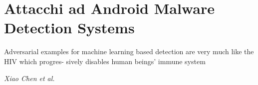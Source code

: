 \graphicspath{ {aml_vs_md/imgs/} }

\section{Attacchi ad Android Malware Detection Systems}

\epigraph{Adversarial examples for machine learning based detection are very much like the HIV which progres- sively disables human beings’ immune system}{\textit{Xiao Chen et al.} \cite{hiv}}




